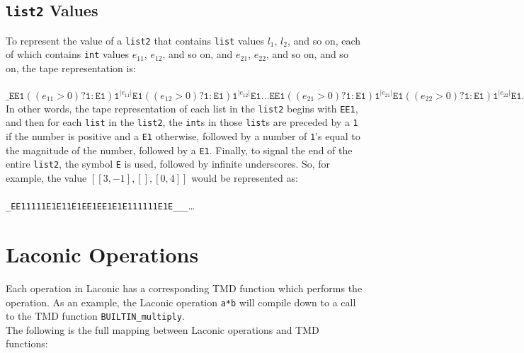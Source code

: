 \documentclass[11pt]{article}
\begin{document}
\subsection{\texttt{list2} Values}

To represent the value of a \texttt{list2} that contains \texttt{list} values $l_1$, $l_2$, and so on, each of which contains \texttt{int} values $e_{11}$, $e_{12}$, and so on, and $e_{21}$, $e_{22}$, and so on, and so on, the tape representation is: \\ \\
$\texttt{_EE1}((e_{11}>0)?\texttt{1}:\texttt{E1})\texttt{1}^{|e_{11}|}\texttt{E1}
((e_{12}>0)?\texttt{1}:\texttt{E1})\texttt{1}^{|e_{12}|}\texttt{E1}\dots\texttt{EE1}
((e_{21}>0)?\texttt{1}:\texttt{E1})\texttt{1}^{|e_{21}|}\texttt{E1}
((e_{22}>0)?\texttt{1}:\texttt{E1})\texttt{1}^{|e_{22}|}\texttt{E1}\dots\dots\texttt{E_}^\infty$ \\

In other words, the tape representation of each list in the \texttt{list2} begins with \texttt{EE1}, and then for each \texttt{list} in the \texttt{list2}, the \texttt{int}s in those \texttt{list}s are preceded by a \texttt{1} if the number is positive and a \texttt{E1} otherwise, followed by a number of \texttt{1}'s equal to the magnitude of the number, followed by a \texttt{E1}. Finally, to signal the end of the entire \texttt{list2}, the symbol \texttt{E} is used, followed by infinite underscores. So, for example, the value $[[3,-1], [], [0,4]]$ would be represented as: \\ \\
\texttt{_EE11111E1E11E1EE1EE1E1E111111E1E___}\dots

\section{Laconic Operations}

Each operation in Laconic has a corresponding TMD function which performs the operation. As an example, the Laconic operation \texttt{a*b} will compile down to a call to the TMD function \texttt{BUILTIN_multiply}. \\

The following is the full mapping between Laconic operations and TMD functions: \\ \\
\end{document}
